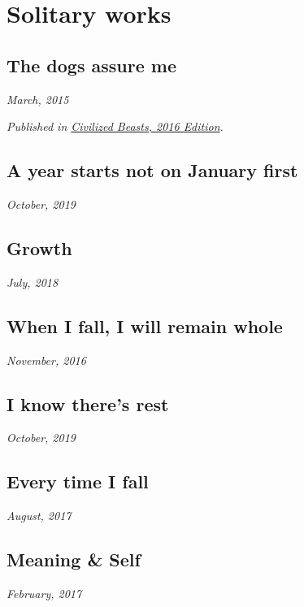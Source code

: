 \chapter{Solitary works}
\thispagestyle{empty}
\newpage


\section*{The dogs assure me}

\hfill\textit{March, 2015}



\textit{Published in \underline{Civilized Beasts, 2016 Edition}.}
\newpage


\section*{A year starts not on January first}

\hfill\textit{October, 2019}




\section*{Growth}

\hfill\textit{July, 2018}


\newpage


\section*{When I fall, I will remain whole}

\hfill\textit{November, 2016}


\newpage


\section*{I know there's rest}

\hfill\textit{October, 2019}


\newpage


\section*{Every time I fall}

\hfill\textit{August, 2017}


\newpage


\section*{Meaning \& Self}

\hfill\textit{February, 2017}


